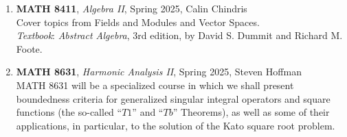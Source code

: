 \documentclass{article}
\begin{document}
\begin{enumerate}
    \item[] \textbf{MATH 8411}, \textit{Algebra II}, Spring 2025, Calin Chindris\\
    Cover topics from Fields and Modules and Vector Spaces. \\
    \textit{Textbook}: \textit{Abstract Algebra}, 3rd edition, by David S. Dummit and Richard M. Foote.

    \item[] \textbf{MATH 8631}, \textit{Harmonic Analysis II}, Spring 2025, Steven Hoffman\\
    MATH 8631 will be a specialized course in which we shall present boundedness criteria for generalized singular integral operators and square functions (the so-called ``$T1$'' and ``$Tb$'' Theorems), as well as some of their applications, in particular, to the solution of the Kato square root problem. 
\end{enumerate}
\end{document}
